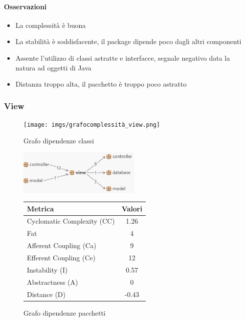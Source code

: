 \documentclass{article}
\begin{document}
\paragraph{Osservazioni}
\begin{itemize}
    \item La complessità è buona
    \item La stabilità è soddisfacente, il package dipende poco dagli altri componenti
    \item Assente l'utilizzo di classi astratte e interfacce, segnale negativo data la natura ad oggetti di Java
    \item Distanza troppo alta, il pacchetto è troppo poco astratto
\end{itemize}


\subsubsection{View}

\begin{figure}[h]
    \centering
    \texttt{[image: imgs/grafocomplessità\_view.png]}
    \caption{Grafo dipendenze classi}
    \label{fig:enter-label}
\end{figure}

\begin{figure}[H]
  \centering
  \begin{minipage}{0.4\textwidth}
    \centering
    \includegraphics[width=6cm]{imgs/coupling_view.png}
    \caption{Grafo dipendenze pacchetti}
    \label{fig:enter-label}
  \end{minipage}
  \hfill
  \begin{minipage}{0.4\textwidth}
    \begin{tabular}{lc}
        \toprule
        \textbf{Metrica} & \textbf{Valori} \\
        \midrule
        Cyclomatic Complexity (CC) & \cellcolor{green}1.26 \\
        Fat & 4 \\
        Afferent Coupling (Ca) & 9 \\
        Efferent Coupling (Ce) & 12 \\
        Instability (I) & \cellcolor{orange}0.57 \\
        Abstractness (A) & \cellcolor{red}0 \\
        Distance (D) & \cellcolor{orange}-0.43 \\
        \bottomrule
    \end{tabular}
  \end{minipage}
\end{figure}
\end{document}
